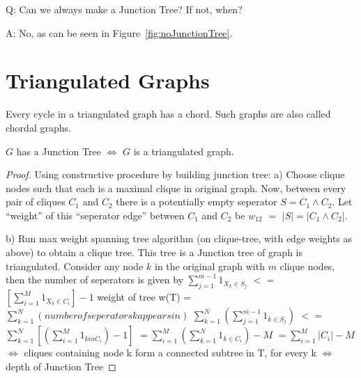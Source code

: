 \documentclass[12pt]{report}
\begin{document}
Q: Can we always make a Junction Tree? If not, when?

A: No, as can be seen in Figure~\ref{fig:noJunctionTree}.

\section{Triangulated Graphs}

Every cycle in a triangulated graph has a chord. Such graphs are also called chordal graphs.

\begin{theorem}
$G$ has a Junction Tree $\Leftrightarrow$ $G$ is a triangulated graph.
\end{theorem}

\begin{proof}
Using constructive procedure by building junction tree:\newline
a) Choose clique nodes such that each is a maximal clique in original graph. Now, between every pair of cliques $C_{1}$ and $C_{2}$ there is a potentially empty seperator $S = C_{1} \land C_{2}$. Let ``weight'' of this ``seperator edge'' between $C_{1}$ and $C_{2}$ be $w_{12}$ $=$ $|S| = |C_{1} \land C_{2}|.$

b) Run max weight spanning tree algorithm (on clique-tree, with edge weights as above) to obtain a clique tree. This tree is a Junction tree of graph is triangulated. Consider any node $k$ in the original graph with $m$ clique nodes, then the number of seperators is given by $\sum _{j = 1} ^{m - 1} 1 _{X_{k} \in S_{j}}$ $<=$ $[\sum _{i = 1} ^{M} 1_{X_{k} \in C_{i}}] - 1$ \newline
weight of tree w(T) = $\sum _{k = 1} ^{N} (number of seperators k appears in)$ \newline
$\sum _{k = 1} ^{N} (\sum _{j = 1} ^{m - 1} 1 _{k \in S_{j}})$\newline
$<=$ $\sum _{k = 1} ^{N} [(\sum _{i = 1} ^{M} 1_{k in C_{i}}) - 1]$\newline
$= \sum _{i = 1} ^{M} (\sum _{k = 1} ^{N} 1 _{k \in C_{i}}) - M$\newline
$= \sum _{i = 1} ^{M} |C_{i}| - M$\newline
$\Leftrightarrow$ cliques containing node k form a connected subtree in T, for every k \newline
$\Leftrightarrow$ depth of Junction Tree
\end{proof}
\end{document}
